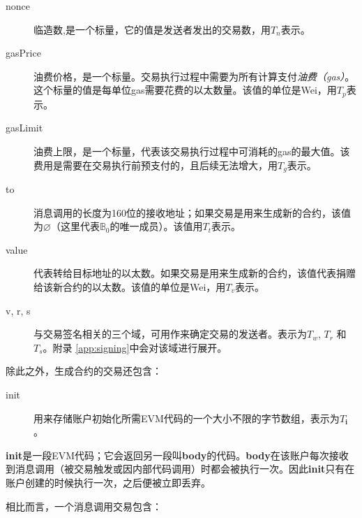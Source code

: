 \documentclass[UTF8,nofonts]{ctexart}
\begin{document}
\begin{multicols}{2}
\begin{description}
\item[nonce] 临造数,是一个标量，它的值是发送者发出的交易数，用$T_n$表示。
\item[gasPrice] 油费价格，是一个标量。交易执行过程中需要为所有计算支付\textit{油费（gas）}。这个标量的值是每单位gas需要花费的以太数量。该值的单位是Wei，用$T_p$表示。
\item[gasLimit] 油费上限，是一个标量，代表该交易执行过程中可消耗的gas的最大值。该费用是需要在交易执行前预支付的，且后续无法增大，用$T_g$表示。
\item[to] 消息调用的长度为160位的接收地址；如果交易是用来生成新的合约，该值为$\varnothing$（这里代表$\mathbb{B}_0$的唯一成员）。该值用$T_t$表示。
\item[value]代表转给目标地址的以太数。如果交易是用来生成新的合约，该值代表捐赠给该新合约的以太数。该值的单位是Wei，用$T_v$表示。
\item[v, r, s] 与交易签名相关的三个域，可用作来确定交易的发送者。表示为$T_w$, $T_r$ 和 $T_s$。附录 \ref{app:signing}中会对该域进行展开。
\end{description}

除此之外，生成合约的交易还包含：

\begin{description}
\item[init] 用来存储账户初始化所需EVM代码的一个大小不限的字节数组，表示为$T_\mathbf{i}$。
\end{description}

\textbf{init}是一段EVM代码；它会返回另一段叫\textbf{body}的代码。\textbf{body}在该账户每次接收到消息调用（被交易触发或因内部代码调用）时都会被执行一次。因此\textbf{init}只有在账户创建的时候执行一次，之后便被立即丢弃。

相比而言，一个消息调用交易包含：


\end{multicols}
\end{document}
